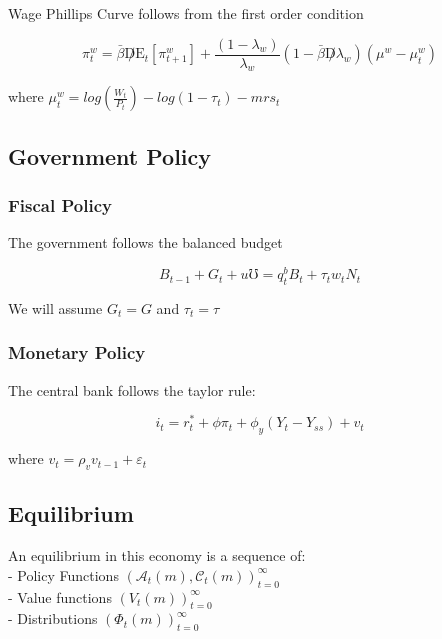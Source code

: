 \documentclass[titlepage]{\econtex}\providecommand{\texname}{BufferStockTheory}
\begin{document}
Wage Phillips Curve follows from the first order condition


$$ \pi_{t}^{w} =   \bar{\beta} \not D  \mathrm{E}_{t} \left[ \pi_{t+1}^{w}\right] + \frac{(1-\lambda_{w})}{\lambda_{w}} (1- \bar{\beta} \not D \lambda_{w}) (\mu^{w} - \mu_{t}^{w})$$

where $\mu_{t}^{w} = log\left( \frac{W_{t}}{P_{t}}\right)  - log\left(1 -\tau_{t}\right) - mrs_{t}$


\hypertarget{Government Policy}{}
\subsection{Government Policy}



\hypertarget{Fiscal Policy}{}
\subsubsection{Fiscal Policy}

The government follows the balanced budget

$$ B_{t-1} + G_{t} + \mathit{u} \mho =   q^{b}_{t} B_{t} +  \tau_{t} w_{t} N_{t} $$ 

We will assume $ G_{t} = G$ and $ \tau_{t} = \tau$

\hypertarget{Monetary Policy}{}
\subsubsection{Monetary Policy}


The central bank follows the taylor rule: 

$$i_{t} = r_{t}^{*} +\phi \pi_{t} + \phi_{y} (Y_{t} - Y_{ss}) + v_{t}$$

where $v_{t} = \rho_{v} v_{t-1} +\varepsilon_{t}$


\hypertarget{Equilibrium}{}
\subsection{Equilibrium}


An equilibrium in this economy is a sequence of: \\

- Policy Functions $\left( \mathcal{A}_{t}(m) , \mathcal{C}_{t}(m) \right )_{t=0}^{\infty}$ \\

- Value functions $ \left( V_{t}(m) \right)_{t=0}^{\infty}$\\

- Distributions $ \left(\Phi_{t}(m) \right)_{t=0}^{\infty}$\\
\end{document}
